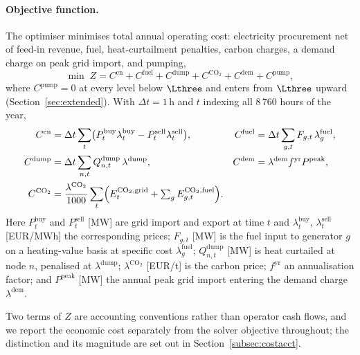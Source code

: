 \paragraph{Objective function.}
The optimiser minimises total annual operating cost: electricity procurement net of
feed-in revenue, fuel, heat-curtailment penalties, carbon charges, a demand charge on
peak grid import, and pumping,
%
\begin{equation}
  \min \; Z = C^{\mathrm{en}} + C^{\mathrm{fuel}}
    + C^{\mathrm{dump}} + C^{\mathrm{CO_2}} + C^{\mathrm{dem}}
    + C^{\mathrm{pump}},
  \label{eq:objective}
\end{equation}
%
where $C^{\mathrm{pump}} = 0$ at every level below $\Lthree$ and enters from $\Lthree$
upward (Section~\ref{sec:extended}). With $\Delta t = 1$\,h and $t$ indexing all
8\,760 hours of the year,
%
\begin{align*}
C^{\mathrm{en}}   &= \Delta t \sum_t
  \bigl(P_t^{\mathrm{buy}} \lambda_t^{\mathrm{buy}}
        - P_t^{\mathrm{sell}} \lambda_t^{\mathrm{sell}}\bigr), &
C^{\mathrm{fuel}} &= \Delta t \sum_{g,t}
  F_{g,t}\, \lambda_g^{\mathrm{fuel}}, \\
C^{\mathrm{dump}} &= \Delta t \sum_{n,t}
  Q_{n,t}^{\mathrm{dump}}\, \lambda^{\mathrm{dump}}, &
C^{\mathrm{dem}}  &= \lambda^{\mathrm{dem}} f^{\mathrm{yr}}
  P^{\mathrm{peak}}, \\
C^{\mathrm{CO_2}} &= \frac{\lambda^{\mathrm{CO_2}}}{1000} \sum_t
  \Bigl(E_t^{\mathrm{CO_2,grid}} +
        \textstyle\sum_g E_{g,t}^{\mathrm{CO_2,fuel}}\Bigr). &&
\end{align*}
%
Here $P_t^{\mathrm{buy}}$ and $P_t^{\mathrm{sell}}$ [MW] are grid import and export at
time $t$ and $\lambda_t^{\mathrm{buy}}$, $\lambda_t^{\mathrm{sell}}$ [EUR/MWh] the
corresponding prices; $F_{g,t}$ [MW] is the fuel input to generator $g$ on a
heating-value basis at specific cost $\lambda_g^{\mathrm{fuel}}$;
$Q_{n,t}^{\mathrm{dump}}$ [MW] is heat curtailed at node $n$, penalised at
$\lambda^{\mathrm{dump}}$; $\lambda^{\mathrm{CO_2}}$ [EUR/t] is the carbon price;
$f^{\mathrm{yr}}$ an annualisation factor; and $P^{\mathrm{peak}}$ [MW] the annual peak
grid import entering the demand charge $\lambda^{\mathrm{dem}}$.

Two terms of $Z$ are accounting conventions rather than operator cash flows, and we
report the economic cost separately from the solver objective throughout; the
distinction and its magnitude are set out in Section~\ref{subsec:costacct}.

